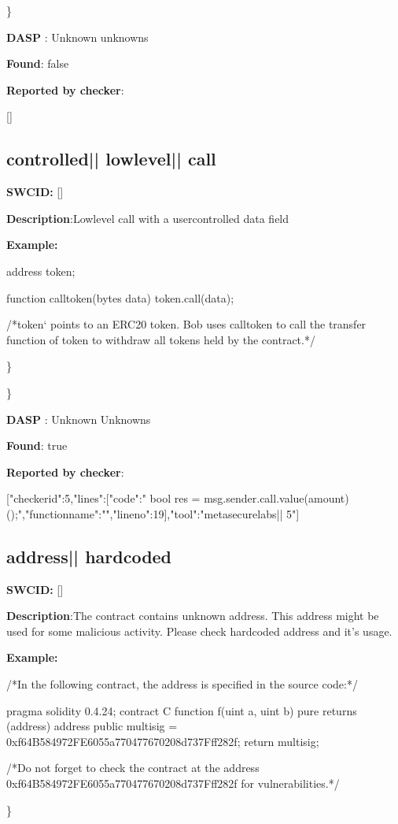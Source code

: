 \documentclass{article}
\begin{document}
\} 

\textbf{DASP} : Unknown unknowns

\textbf{Found}: false

\textbf{Reported by checker}: 
\begin{ffcode} 

[]
\end{ffcode} 
\subsection{controlled{|\textunderscore| }lowlevel{|\textunderscore| }call} 
\textbf{SWC{\textunderscore }ID:} []

\textbf{Description}:Low{\textendash}level call with a user{\textendash}controlled data field


\textbf{Example:} 
\begin{ffcode} 

address token;

function call\textunderscore token(bytes data){
  token.call(data);
}

 /*token` points to an ERC20 token. Bob uses call\textunderscore token to call the transfer function of token to withdraw all tokens held by the contract.*/ 

\end{ffcode} 
\} 

\} 

\textbf{DASP} : Unknown Unknowns

\textbf{Found}: true

\textbf{Reported by checker}: 
\begin{ffcode} 

[{"checker\textunderscore id":5,"lines":[{"code":"      bool res = msg.sender.call.value(amount)();\n","function\textunderscore name":"","line\textunderscore no":19}],"tool":"metasecurelabs|\textendash| 5"}]
\end{ffcode} 
\subsection{address{|\textunderscore| }hardcoded} 
\textbf{SWC{\textunderscore }ID:} []

\textbf{Description}:The contract contains unknown address. This address might be used for some malicious activity. Please check hardcoded address and it's usage.


\textbf{Example:} 
\begin{ffcode} 

/*In the following contract, the address is specified in the source code:*/ 

pragma solidity 0.4.24;
contract C {
  function f(uint a, uint b) pure returns (address) {
    address public multisig = 0xf64B584972FE6055a770477670208d737Fff282f;
    return multisig;
        }
}

 /*Do not forget to check the contract at the address 0xf64B584972FE6055a770477670208d737Fff282f for vulnerabilities.*/ 

\end{ffcode} 
\} 
\end{document}
